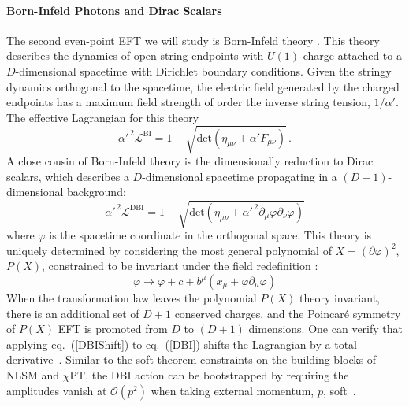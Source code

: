 \documentclass[11pt,letter]{article}
\def\eqn#1{eq.~(\ref{#1})}
\begin{document}
\paragraph{Born-Infeld Photons and Dirac Scalars}
The second even-point EFT we will study is Born-Infeld theory \cite{Born:1934gh}. This theory describes the dynamics of open string endpoints with $U(1)$ charge attached to a $D$-dimensional spacetime with Dirichlet boundary conditions. Given the stringy dynamics orthogonal to the spacetime, the electric field generated by the charged endpoints has a maximum field strength of order the inverse string tension, $1/\alpha'$. The effective Lagrangian for this theory
\begin{equation}
 \label{biLag}
  \alpha'^{\,2}\mathcal{L}^{\text{BI}} = 1-\sqrt{\text{det}(\eta_{\mu\nu}+\alpha' F_{\mu\nu})} \,.
\end{equation}
A close cousin of Born-Infeld theory is the dimensionally reduction to Dirac scalars, which describes a $D$-dimensional spacetime propagating in a $(D+1)$-dimensional background:
\begin{equation}
 \label{DBI}
  \alpha'^{\,2}\mathcal{L}^{\text{DBI}} =1- \sqrt{\text{det}(\eta_{\mu\nu}+\alpha'^{\,2} \partial_\mu \varphi \partial_\nu \varphi)}
\end{equation}
where $\varphi$ is the spacetime coordinate in the orthogonal space. This theory is uniquely determined by considering the most general polynomial  of $X=(\partial \varphi)^2$, $P(X)$,  constrained to be invariant under the field redefinition \cite{Cheung:2016drk}:
\begin{equation}\label{DBIShift}
\varphi \rightarrow \varphi + c + b^{\mu} (x_\mu + \varphi \partial_\mu \varphi)
\end{equation}
When the transformation law leaves the polynomial $P(X)$ theory invariant, there is an additional set of $D+1$ conserved charges, and the Poincar\'{e} symmetry of $P(X)$ EFT is promoted from $D$ to $(D+1)$ dimensions. One can verify that applying \eqn{DBIShift} to \eqn{DBI} shifts the Lagrangian by a total derivative~\cite{deRham:2010eu}. Similar to the soft theorem constraints on the building blocks of NLSM and $\chi \text{PT}$, the DBI action can be bootstrapped by requiring the amplitudes vanish at $\mathcal{O}(p^2)$ when taking external momentum, $p$, soft~\cite{Cheung:2016drk}.
\end{document}
